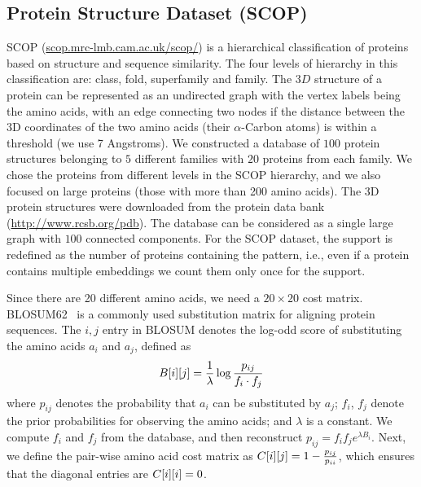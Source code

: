 


\subsection{Protein Structure Dataset (SCOP)}
SCOP (\url{scop.mrc-lmb.cam.ac.uk/scop/}) 
is a hierarchical classification of proteins based on structure
and sequence similarity. The four levels of hierarchy in this
classification are: class, fold, superfamily and family.  The $3D$
structure of a protein can be represented as an undirected graph with
the vertex labels being the amino acids, with an edge connecting two
nodes if the distance between the 
3D coordinates of the two amino acids (their
$\alpha$-Carbon atoms) is within a threshold (we use 7 Angstroms).
We constructed a database of
$100$ protein structures belonging to $5$ different families with $20$
proteins from each family. 
We chose the proteins from different levels in the SCOP hierarchy, and
we also focused on large proteins (those with more than 200 amino
acids). 
The 3D protein structures were downloaded from the
protein data bank (\url{http://www.rcsb.org/pdb}).  The database
can be considered as a single large graph with $100$ connected
components. 
For the SCOP dataset, the support is redefined as 
the number of proteins containing the pattern, i.e., 
even if a protein contains multiple embeddings we count them only once for the support.

\smallskip{}
Since there are 20 different amino acids, we need a $20 \times 20$ cost
matrix. BLOSUM62~\cite{HH92} is a commonly used substitution matrix for aligning protein
sequences.  The $i,j$ entry in BLOSUM denotes the log-odd score
of substituting the amino acids $a_i$ and $a_j$, defined as
\begin{equation*}
    \label{eq:blosum}
    {B}[i][j] = \frac{1}{\lambda} 
	\log\frac{p_{ij}}{f_i \cdot f_j}
\end{equation*}
where $p_{ij}$ denotes the probability that  $a_i$ can be
substituted by $a_j$; 
$f_i$, $f_j$ denote the prior probabilities for observing the 
amino acids; and $\lambda$ is a constant. We compute $f_i$ and $f_j$
from the database, and then reconstruct $p_{ij}=f_if_j e^{\lambda
B_{i}}$. Next, we define the pair-wise amino acid cost matrix as
${C}[i][j] = 1-\frac{p_{ij}}{p_{ii}}$, which ensures that
the diagonal entries are ${C}[i][i] =0$.

